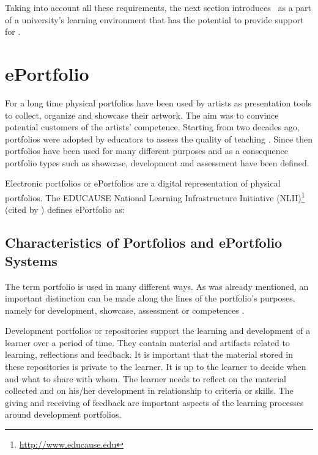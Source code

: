 Taking into account all these requirements, the next section introduces \ep~as a
part of a university's learning environment that has the potential to provide
support for \LLLsn.

\section{ePortfolio}
For a long time physical portfolios have been used by artists as presentation
tools to collect, organize and showcase their artwork. The aim was to convince
potential customers of the artists' competence. Starting from two decades ago,
portfolios were adopted by educators to assess the quality of teaching
\citep{VanTartwijkJ.2004}. Since then portfolios have been used for many
different purposes and as a consequence portfolio types such as showcase,
development and assessment have been defined.
 
Electronic portfolios or ePortfolios are a digital representation of physical
portfolios. The EDUCAUSE National Learning Infrastructure Initiative
(NLII)\footnote{\url{http://www.educause.edu}} (cited by
\citealp{IMSGlobalLearningConsortium2005}) defines ePortfolio as:


\subsection{Characteristics of Portfolios and ePortfolio Systems}
\label{sec:charep}
The term portfolio is used in many different ways. As was already mentioned, an
important distinction can be made along the lines of the portfolio's purposes,
namely for development, showcase, assessment or competences
\citep{VanTartwijkJ.2004}.

Development portfolios or repositories support the learning and development of a
learner over a period of time. They contain material and artifacts related to
learning, reflections and feedback. It is important that the material stored in
these repositories is private to the learner. It is up to the learner to decide
when and what to share with whom. The learner needs to reflect on the material
collected and on his/her development in relationship to criteria or skills. The
giving and receiving of feedback are important aspects of the learning processes
around development portfolios.

